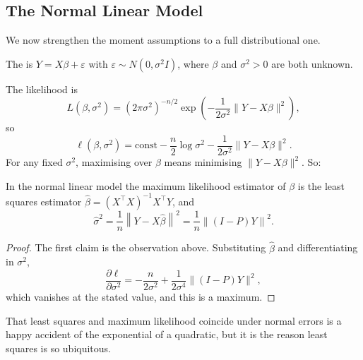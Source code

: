 \documentclass[a4paper]{scrartcl}
\begin{document}
\subsection{The Normal Linear Model}

We now strengthen the moment assumptions to a full distributional one.

\begin{definition}
  The  is $Y = X\beta + \varepsilon$ with $\varepsilon \sim N(0,\sigma^2 I)$, where $\beta$ and $\sigma^2 > 0$ are both unknown.
\end{definition}

The likelihood is
$$
L(\beta,\sigma^2) = (2\pi\sigma^2)^{-n/2}\exp\left(-\frac{1}{2\sigma^2}\|Y-X\beta\|^2\right),
$$
so
$$
\ell(\beta,\sigma^2) = \text{const} - \frac n2\log\sigma^2 - \frac{1}{2\sigma^2}\|Y-X\beta\|^2.
$$
For any fixed $\sigma^2$, maximising over $\beta$ means minimising $\|Y - X\beta\|^2$. So:

\begin{proposition}
  In the normal linear model the maximum likelihood estimator of $\beta$ is the least squares estimator $\hat\beta = (X^\top X)^{-1}X^\top Y$, and
  $$
  \hat\sigma^2 = \frac{1}{n}\left\|Y - X\hat\beta\right\|^2 = \frac{1}{n}\left\|(I-P)Y\right\|^2.
  $$
\end{proposition}
\begin{proof}
  The first claim is the observation above. Substituting $\hat\beta$ and differentiating in $\sigma^2$,
  $$
  \frac{\partial\ell}{\partial\sigma^2} = -\frac{n}{2\sigma^2}+\frac{1}{2\sigma^4}\|(I-P)Y\|^2,
  $$
  which vanishes at the stated value, and this is a maximum.
\end{proof}

That least squares and maximum likelihood coincide under normal errors is a happy accident of the exponential of a quadratic, but it is the reason least squares is so ubiquitous.
\end{document}
